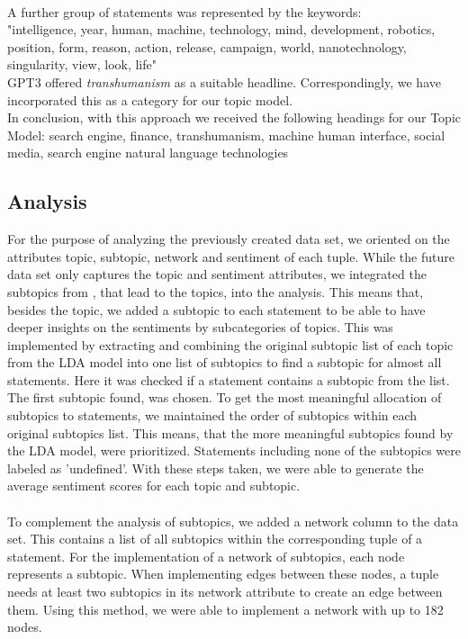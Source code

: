\\
A further group of statements was represented by the keywords:
\\
"intelligence, year, human, machine, technology, mind, development, robotics, position, form, reason, action, release, campaign, world, nanotechnology, singularity, view, look, life"
\\
GPT3 offered \emph{transhumanism} as a suitable headline.
Correspondingly, we have incorporated this as a category for our topic model.
\\
In conclusion, with this approach we received the following headings for our Topic Model: search engine, finance, transhumanism, machine human interface, social media, search engine natural language technologies

\subsection{Analysis}
For the purpose of analyzing the previously created data set, we oriented on the attributes topic, subtopic, network and sentiment of each tuple. While the future data set only captures the topic and sentiment attributes, we integrated the subtopics from , that lead to the topics, into the analysis. This means that, besides the topic, we added a subtopic to each statement to be able to have deeper insights on the sentiments by subcategories of topics. This was implemented by extracting and combining the original subtopic list of each topic from the LDA model into one list of subtopics to find a subtopic for almost all statements. Here it was checked if a statement contains a subtopic from the list. The first subtopic found, was chosen. To get the most meaningful allocation of subtopics to statements, we maintained the order of subtopics within each original subtopics list. This means, that the more meaningful subtopics found by the LDA model, were prioritized. Statements including none of the subtopics were labeled as 'undefined'. With these steps taken, we were able to generate the average sentiment scores for each topic and subtopic. 
\\
\\
To complement the analysis of subtopics, we added a network column to the data set. This contains a list of all subtopics within the corresponding tuple of a statement. For the implementation of a network of subtopics, each node represents a subtopic. When implementing edges between these nodes, a tuple needs at least two subtopics in its network attribute to create an edge between them. Using this method, we were able to implement a network with up to 182 nodes.

